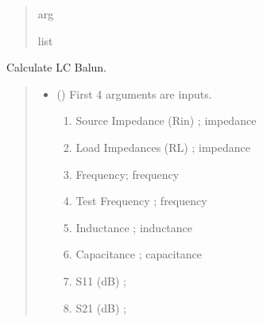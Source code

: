 \documentclass[letterpaper,10pt,english]{sphinxmanual}
\begin{document}
\begin{fulllineitems}
\begin{quote}
\begin{description}
\begin{itemize}
\end{itemize}

\sphinxAtStartPar
arg

\sphinxAtStartPar
list

\end{description}\end{quote}

\end{fulllineitems}


\begin{fulllineitems}
\label{\detokenize{components:components.LC_Balun}}
\pysigstartsignatures
{}
\pysigstopsignatures
\sphinxAtStartPar
Calculate LC Balun.
\begin{quote}\begin{description}
\begin{itemize}
\item {} 
\sphinxAtStartPar
{} () \textendash{} 
\sphinxAtStartPar
First 4 arguments are inputs.
\begin{enumerate}
%
\item {} 
\sphinxAtStartPar
Source Impedance (Rin) ; impedance

\item {} 
\sphinxAtStartPar
Load Impedances (RL) ; impedance

\item {} 
\sphinxAtStartPar
Frequency; frequency

\item {} 
\sphinxAtStartPar
Test Frequency ; frequency

\item {} 
\sphinxAtStartPar
Inductance ; inductance

\item {} 
\sphinxAtStartPar
Capacitance ; capacitance

\item {} 
\sphinxAtStartPar
S11 (dB) ;

\item {} 
\sphinxAtStartPar
S21 (dB) ;


\end{enumerate}
\end{itemize}
\end{description}
\end{quote}
\end{fulllineitems}
\end{document}
